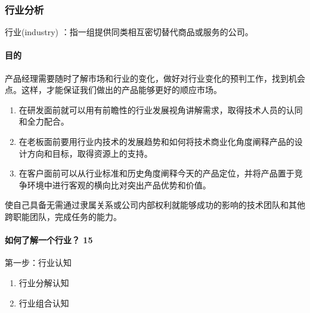 \documentclass[letterpaper,11pt,english]{sphinxmanual}
\begin{document}
\subsubsection{行业分析}
\label{\detokenize{chapter_knowledge/industry_analysis:industry-analysis}}\label{\detokenize{chapter_knowledge/industry_analysis:id1}}\label{\detokenize{chapter_knowledge/industry_analysis::doc}}
行业(industry)
：指一组提供同类相互密切替代商品或服务的公司。%
\begin{footnote}[426]\sphinxAtStartFootnote
{}
%
\end{footnote}


\paragraph{目的}
\label{\detokenize{chapter_knowledge/industry_analysis:id2}}
产品经理需要随时了解市场和行业的变化，做好对行业变化的预判工作，找到机会点。这样，才能保证我们做出的产品能够更好的顺应市场。
\begin{enumerate}
%
\item {} 
在研发面前就可以用有前瞻性的行业发展视角讲解需求，取得技术人员的认同和全力配合。

\item {} 
在老板面前要用行业内技术的发展趋势和如何将技术商业化角度阐释产品的设计方向和目标，取得资源上的支持。

\item {} 
在客户面前可以从行业标准和历史角度阐释今天的产品定位，并将产品置于竞争环境中进行客观的横向比对突出产品优势和价值。%
\begin{footnote}[427]\sphinxAtStartFootnote
{}
%
\end{footnote}

\end{enumerate}

使自己具备无需通过隶属关系或公司内部权利就能够成功的影响的技术团队和其他跨职能团队，完成任务的能力。


\paragraph{如何了解一个行业？ 15\sphinxfootnotemark[428]}
\label{\detokenize{chapter_knowledge/industry_analysis:id3}}%
\begin{footnotetext}[428]\sphinxAtStartFootnote
{}
%
\end{footnotetext}\ignorespaces 
第一步：行业认知
\begin{enumerate}
%
\item {} 
行业分解认知

\item {} 
行业组合认知

\end{enumerate}
\end{document}
